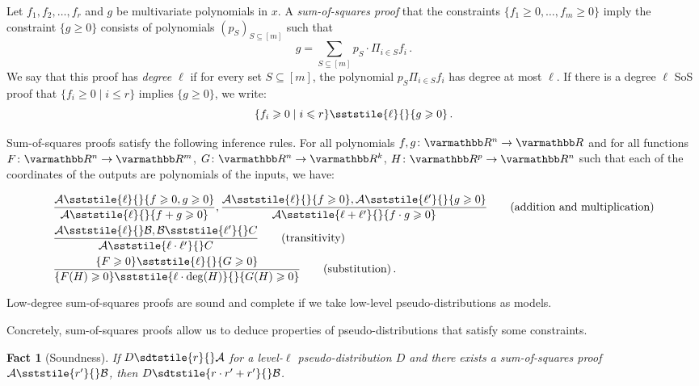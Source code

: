 \documentclass{article}
\newtheorem{fact}[theorem]{Fact}
\theoremstyle{definition}
\theoremstyle{remark}
\let\mathbb\varmathbb
\newcommand{\mper}{\,.}
\newcommand{\R}{\mathbb R}
\newcommand{\cA}{\mathcal A}
\newcommand{\cB}{\mathcal B}
\renewcommand{\leq}{\leqslant}
\renewcommand{\geq}{\geqslant}
\numberwithin{equation}{section}
\newcommand{\1}{\bm{1}}
\begin{document}
Let $f_1, f_2, \ldots, f_r$ and $g$ be multivariate polynomials in $x$.
A \emph{sum-of-squares proof} that the constraints $\{f_1 \geq 0, \ldots, f_m \geq 0\}$ imply the constraint $\{g \geq 0\}$ consists of  polynomials $(p_S)_{S \subseteq [m]}$ such that
\begin{equation}
g = \sum_{S \subseteq [m]} p_S \cdot \Pi_{i \in S} f_i
\mper
\end{equation}
We say that this proof has \emph{degree $\ell$} if for every set $S \subseteq [m]$, the polynomial $p_S \Pi_{i \in S} f_i$ has degree at most $\ell$.
If there is a degree $\ell$ SoS proof that $\{f_i \geq 0 \mid i \leq r\}$ implies $\{g \geq 0\}$, we write:
\begin{equation}
\{f_i \geq 0 \mid i \leq r\} \sststile{\ell}{}\{g \geq 0\}
\mper
\end{equation}


Sum-of-squares proofs satisfy the following inference rules.
For all polynomials $f,g\colon\R^n \to \R$ and for all functions $F\colon \R^n \to \R^m$, $G\colon \R^n \to \R^k$, $H\colon \R^{p} \to \R^n$ such that each of the coordinates of the outputs are polynomials of the inputs, we have:

\begin{align}
&\frac{\cA \sststile{\ell}{} \{f \geq 0, g \geq 0 \} } {\cA \sststile{\ell}{} \{f + g \geq 0\}}, \frac{\cA \sststile{\ell}{} \{f \geq 0\}, \cA \sststile{\ell'}{} \{g \geq 0\}} {\cA \sststile{\ell+\ell'}{} \{f \cdot g \geq 0\}} \tag{addition and multiplication}\\
&\frac{\cA \sststile{\ell}{} \cB, \cB \sststile{\ell'}{} C}{\cA \sststile{\ell \cdot \ell'}{} C}  \tag{transitivity}\\
&\frac{\{F \geq 0\} \sststile{\ell}{} \{G \geq 0\}}{\{F(H) \geq 0\} \sststile{\ell \cdot \deg(H)} {} \{G(H) \geq 0\}} \tag{substitution}\mper
\end{align}

Low-degree sum-of-squares proofs are sound and complete if we take low-level pseudo-distributions as models.

Concretely, sum-of-squares proofs allow us to deduce properties of pseudo-distributions that satisfy some constraints.

\begin{fact}[Soundness]
	\label{fact:sos-soundness}
	If $D \sdtstile{r}{} \cA$ for a level-$\ell$ pseudo-distribution $D$ and there exists a sum-of-squares proof $\cA \sststile{r'}{} \cB$, then $D \sdtstile{r\cdot r'+r'}{} \cB$.
\end{fact}
\end{document}
